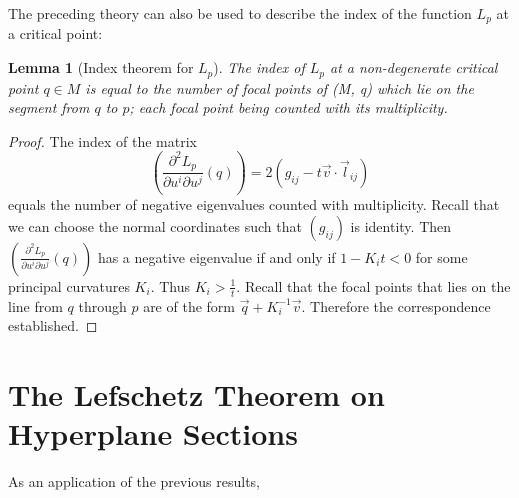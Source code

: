 \documentclass[a4paper,11pt,reqno]{amsart}
\newtheorem{lem}[thm]{Lemma}
\newcommand{\vect}[1]{\vec{#1}}
\begin{document}
The preceding theory can also be used to describe the index of the function
$L_p$ at a critical point:

\begin{lem}[Index theorem for $L_p$]
  The index of $L_p$ at a non-degenerate critical point $q \in M$ is equal to
  the number of focal points of (M, q) which lie on the segment from $q$ to $p$;
  each focal point being counted with its multiplicity.
\end{lem}

\begin{proof}
  The index of the matrix 
  \begin{equation}
    \left( \frac{\partial^2 L_p}{\partial u^i \partial
        u^j}(q) \right) = 2(g_{ij}-t\vect{v} \cdot \vect{l}_{ij})
  \end{equation}
  equals the number of negative eigenvalues counted with multiplicity. Recall
  that we can choose the normal coordinates such that $(g_{ij})$ is
  identity. Then$\left( \frac{\partial^2 L_p}{\partial u^i \partial u^j}(q)
  \right)$ has a negative eigenvalue if and only if $1-K_it < 0$ for some
  principal curvatures $K_i$. Thus $K_i > \frac{1}{t}$. Recall that the focal
  points that lies on the line from $q$ through $p$ are of the form
  $\vect{q}+K_i^{-1}\vect{v}$. Therefore the correspondence established.
  
\end{proof}

\section{The Lefschetz Theorem on Hyperplane Sections}

As an application of the previous results, 
\end{document}
